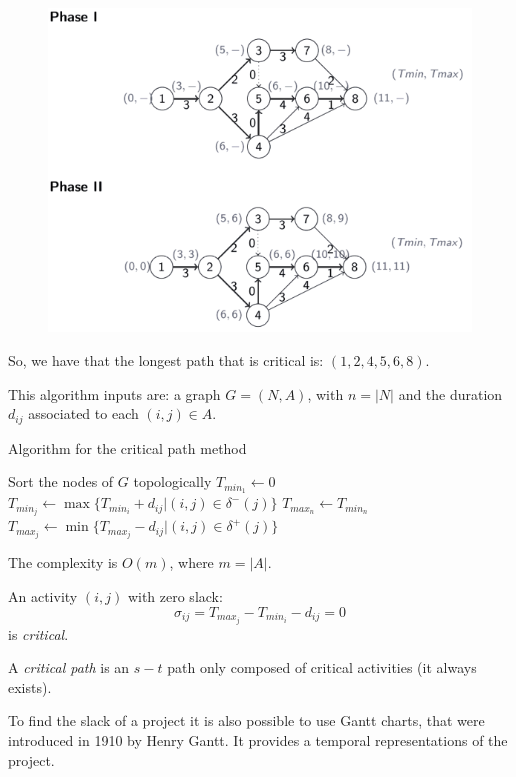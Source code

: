 \documentclass[12pt, a4paper]{report}
\newtheorem[style=M,bodystyle=\normalfont]{proposition}{Proposition}
\newtheorem[style=M,bodystyle=\normalfont]{theorem}{Theorem}
\newtheorem[style=M,bodystyle=\normalfont]{corollary}{Corollary}
\newtheorem[style=M,bodystyle=\normalfont]{lemma}{Lemma}
\newtheorem[style=M,bodystyle=\normalfont]{definition}{Definition}
\begin{document}
\begin{example}
        \begin{figure}[H]
            \centering
            \includegraphics[width=0.75\linewidth]{images/aproject.png}
        \end{figure}
        So, we have that the longest path that is critical is: $(1,2,4,5,6,8)$.
    \end{example}
    This algorithm inputs are: a graph $G = (N,A)$, with $n= \left\lvert N \right\rvert $ and the duration $d_{ij}$ associated to each $(i,j) \in A$. 
    \begin{algorithm}[H]
        \caption{Algorithm for the critical path method}
            \begin{algorithmic}[1]
                \State Sort the nodes of $G$ topologically
                \State $T_{min_1} \leftarrow 0$
                    \State $T_{min_j} \leftarrow \max\{T_{min_i}+d_{ij}|(i,j) \in \delta^{-}(j)\}$
                \EndFor
                \State $T_{max_n} \leftarrow T_{min_n}$
                \State $T_{max_j} \leftarrow \min\{T_{max_j}-d_{ij}|(i,j) \in \delta^{+}(j)\}$
                \EndFor
            \end{algorithmic}
    \end{algorithm}
    The complexity is $O(m)$, where $m = \left\lvert A \right\rvert $. 
    \begin{definition}
        An activity $(i,j)$ with zero slack: 
        \[\sigma_{ij}=T_{max_j}-T_{min_i}-d_{ij}=0\]
        is \emph{critical}. 

        A \emph{critical path} is an $s-t$ path only composed of critical activities (it always exists).
    \end{definition}
    To find the slack of a project it is also possible to use Gantt charts, that were introduced in 1910 by Henry Gantt. It provides a temporal representations of the project. 
\end{document}
